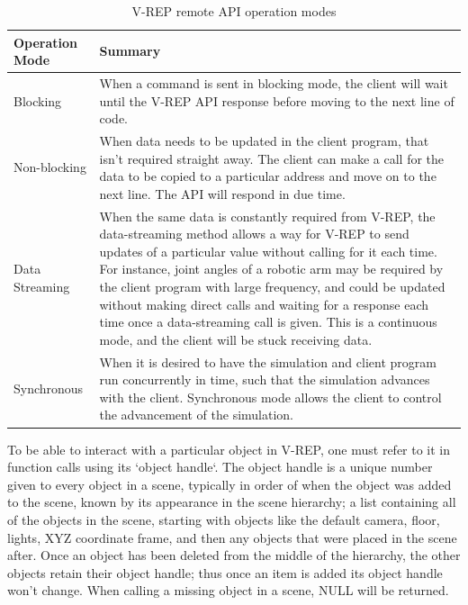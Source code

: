 \documentclass[12pt,openany,a4paper]{book}
\begin{document}
\begin{center}
\begin{table}[htb]


    \begin{tabular}{ | l | p{10cm} |}
    \hline
    Operation Mode & Summary \\ \hline
     Blocking & When a command is sent in blocking mode, the client will wait until the V-REP API response before moving to the next line of code.\\ \hline
    Non-blocking & When data needs to be updated in the client program, that isn't required straight away. The client can make a call for the data to be copied to a particular address and move on to the next line. The API will respond in due time.  \\ \hline
    Data Streaming & When the same data is constantly required from V-REP, the data-streaming method allows a way for V-REP to send updates of a particular value without calling for it each time. For instance, joint angles of a robotic arm may be required by the client program with large frequency, and could be updated without making direct calls and waiting for a response each time once a data-streaming call is given. This is a continuous mode, and the client will be stuck receiving data. \\
    \hline
    Synchronous & When it is desired to have the simulation and client program run concurrently in time, such that the simulation advances with the client. Synchronous mode allows the client to control the advancement of the simulation.\\
    \hline
    \end{tabular}
    \caption{V-REP remote API operation modes}
\end{table}
\end{center}

To be able to interact with a particular object in V-REP, one must refer to it in function calls using its `object handle`. The object handle is a unique number given to every object in a scene, typically in order of when the object was added to the scene, known by its appearance in the scene hierarchy; a list containing all of the objects in the scene, starting with objects like the default camera, floor, lights, XYZ coordinate frame, and then any objects that were placed in the scene after. Once an object has been deleted from the middle of the hierarchy, the other objects retain their object handle; thus once an item is added its object handle won't change. When calling a missing object in a scene, NULL will be returned.
\end{document}
